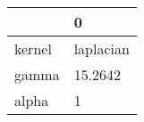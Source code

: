 \begin{tabular}{ll}
\toprule
{} &          0 \\
\midrule
kernel &  laplacian \\
gamma  &    15.2642 \\
alpha  &          1 \\
\bottomrule
\end{tabular}
